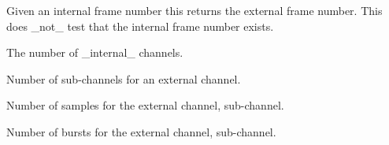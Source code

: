 \documentclass[letterpaper,10pt,english]{sphinxmanual}
\begin{document}
\begin{fulllineitems}
\begin{fulllineitems}
\end{fulllineitems}


\begin{fulllineitems}
\label{\detokenize{ref/LIS/core/FrameSet:TotalDepth.LIS.core.FrameSet.FrameSet.extFrameNum}}
Given an internal frame number this returns the external frame number.
This does \_not\_ test that the internal frame number exists.

\end{fulllineitems}


\begin{fulllineitems}
\label{\detokenize{ref/LIS/core/FrameSet:TotalDepth.LIS.core.FrameSet.FrameSet.numChannels}}
The number of \_internal\_ channels.

\end{fulllineitems}


\begin{fulllineitems}
\label{\detokenize{ref/LIS/core/FrameSet:TotalDepth.LIS.core.FrameSet.FrameSet.numSubChannels}}
Number of sub-channels for an external channel.

\end{fulllineitems}


\begin{fulllineitems}
\label{\detokenize{ref/LIS/core/FrameSet:TotalDepth.LIS.core.FrameSet.FrameSet.numSamples}}
Number of samples for the external channel, sub-channel.

\end{fulllineitems}


\begin{fulllineitems}
\label{\detokenize{ref/LIS/core/FrameSet:TotalDepth.LIS.core.FrameSet.FrameSet.numBursts}}
Number of bursts for the external channel, sub-channel.


\end{fulllineitems}
\end{fulllineitems}
\end{document}
